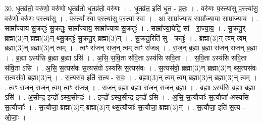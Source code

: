 \documentclass[17pt]{extarticle}
\begin{document}
30. धृ॒तव्र॑तो॒ वरु॑णो॒ वरु॑णो धृ॒तव्र॑तो धृ॒तव्र॑तो॒ वरु॑णः । . धृ॒तव्र॑त॒ इति॑ धृ॒त - व्र॒तः॒ । . वरु॑णः प॒स्त्या॑सु प॒स्त्या॑सु॒ वरु॑णो॒ वरु॑णः प॒स्त्या॑सु । . प॒स्त्या᳚ स्वा प॒स्त्या॑सु प॒स्त्या᳚ स्वा । . आ साम्रा᳚ज्याय॒ साम्रा᳚ज्या॒या साम्रा᳚ज्याय । . साम्रा᳚ज्याय सु॒क्रतुः॑ सु॒क्रतुः॒ साम्रा᳚ज्याय॒ साम्रा᳚ज्याय सु॒क्रतुः॑ । . साम्रा᳚ज्या॒येति॒ सां - रा॒ज्या॒य॒ । . सु॒क्रतु॒र् ब्रह्मा(3)न् ब्रह्मा(3)न् थ्सु॒क्रतुः॑ सु॒क्रतु॒र् ब्रह्मा(3)न् । . सु॒क्रतु॒रिति॑ सु - क्रतुः॑ । . ब्रह्मा(3)न् त्वम् त्वम् ब्रह्मा(3)न् ब्रह्मा(3)न् त्वम् । . त्वꣳ रा॑जन् राज॒न् त्वम् त्वꣳ रा॑जन्न् । . रा॒ज॒न् ब्र॒ह्मा ब्र॒ह्मा रा॑जन् राजन् ब्र॒ह्मा । . ब्र॒ह्मा ऽस्य॑सि ब्र॒ह्मा ब्र॒ह्मा ऽसि॑ । . अ॒सि॒ स॒वि॒ता स॑वि॒ता ऽस्य॑सि सवि॒ता । . स॒वि॒ता ऽस्य॑सि सवि॒ता स॑वि॒ता ऽसि॑ । . अ॒सि॒ स॒त्यस॑वः स॒त्यस॑वो ऽस्यसि स॒त्यस॑वः । . स॒त्यस॑वो॒ ब्रह्मा(3)न् ब्रह्मा(3)न् थ्स॒त्यस॑वः स॒त्यस॑वो॒ ब्रह्मा(3)न् । . स॒त्यस॑व॒ इति॑ स॒त्य - स॒वः॒ । . ब्रह्मा(3)न् त्वम् त्वम् ब्रह्मा(3)न् ब्रह्मा(3)न् त्वम् । . त्वꣳ रा॑जन् राज॒न् त्वम् त्वꣳ रा॑जन्न् । . रा॒ज॒न् ब्र॒ह्मा ब्र॒ह्मा रा॑जन् राजन् ब्र॒ह्मा । . ब्र॒ह्मा ऽस्य॑सि ब्र॒ह्मा ब्र॒ह्मा ऽसि॑ । . अ॒सीन्द्र॒ इन्द्रो᳚ ऽस्य॒सीन्द्रः॑ । . इन्द्रो᳚ ऽस्य॒सीन्द्र॒ इन्द्रो॑ ऽसि । . अ॒सि॒ स॒त्यौजाः᳚ स॒त्यौजा॑ अस्यसि स॒त्यौजाः᳚ । . स॒त्यौजा॒ ब्रह्मा(3)न् ब्रह्मा(3)न् थ्स॒त्यौजाः᳚ स॒त्यौजा॒ ब्रह्मा(3)न् । . स॒त्यौजा॒ इति॑ स॒त्य - ओ॒जाः॒ । \newline
\end{document}
